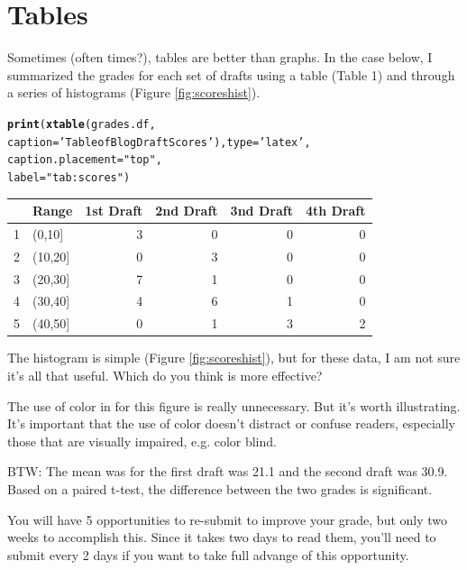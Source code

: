 \documentclass{article}\usepackage[]{graphicx}\usepackage[]{color}
\makeatletter
\newcommand{\hlstr}[1]{\textcolor[rgb]{0.192,0.494,0.8}{#1}}%
\newcommand{\hlstd}[1]{\textcolor[rgb]{0.345,0.345,0.345}{#1}}%
\newcommand{\hlkwc}[1]{\textcolor[rgb]{0.333,0.667,0.333}{#1}}%
\newcommand{\hlkwd}[1]{\textcolor[rgb]{0.737,0.353,0.396}{\textbf{#1}}}%
\newenvironment{kframe}{%
 \def\at@end@of@kframe{}%
 \ifinner\ifhmode%
  \def\at@end@of@kframe{\end{minipage}}%
  \begin{minipage}{\columnwidth}%
 \fi\fi%
 \def\FrameCommand##1{\hskip\@totalleftmargin \hskip-\fboxsep
 \colorbox{shadecolor}{##1}\hskip-\fboxsep
     \hskip-\linewidth \hskip-\@totalleftmargin \hskip\columnwidth}%
 \MakeFramed {\advance\hsize-\width
   \@totalleftmargin\z@ \linewidth\hsize
   \@setminipage}}%
 {\par\unskip\endMakeFramed%
 \at@end@of@kframe}
\makeatother
\begin{document}
\section{Tables}

Sometimes (often times?), tables are better than graphs. In the case below, I summarized the grades for each set of drafts using a table (Table 1) and through a series of histograms (Figure \ref{fig:scoreshist}). 




\begin{kframe}
\begin{alltt}
\hlkwd{print}\hlstd{(}\hlkwd{xtable}\hlstd{(grades.df,}
      \hlkwc{caption}\hlstd{=}\hlstr{'Table of Blog Draft Scores'}\hlstd{),} \hlkwc{type}\hlstd{=}\hlstr{'latex'}\hlstd{,}
      \hlkwc{caption.placement} \hlstd{=} \hlstr{"top"}\hlstd{,}
      \hlkwc{label}\hlstd{=}\hlstr{"tab:scores"}\hlstd{)}
\end{alltt}
\end{kframe}%
% 
\begin{tabular}{rlrrrr}
  \hline
 & Range & 1st Draft & 2nd Draft & 3nd Draft & 4th Draft \\ 
  \hline
1 & (0,10] &   3 &   0 &   0 &   0 \\ 
  2 & (10,20] &   0 &   3 &   0 &   0 \\ 
  3 & (20,30] &   7 &   1 &   0 &   0 \\ 
  4 & (30,40] &   4 &   6 &   1 &   0 \\ 
  5 & (40,50] &   0 &   1 &   3 &   2 \\ 
   \hline
\end{tabular}


\bigskip

The histogram is simple (Figure \ref{fig:scoreshist}), but for these data, I am not sure it's all that useful. Which do you think is more effective? 

The use of color in for this figure is really unnecessary. But it's worth illustrating. It's important that the use of color doesn't distract or confuse readers, especially those that are visually impaired, e.g. color blind.

\bigskip
BTW: The mean was for the first draft was 21.1 and the second draft was 30.9. Based on a paired t-test, the difference between the two grades is significant. 

You will have 5 opportunities to re-submit to improve your grade, but only two weeks to accomplish this. Since it takes two days to read them, you'll need to submit every 2 days if you want to take full advange of this opportunity. 
\end{document}
